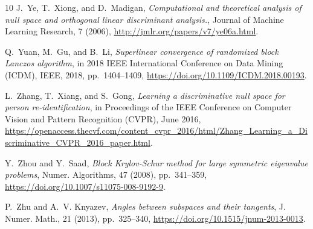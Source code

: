 \documentclass{siamart190516}
\begin{document}
\begin{thebibliography}{10}
{\sc J.~Ye, T.~Xiong, and D.~Madigan}, {\em Computational and theoretical
  analysis of null space and orthogonal linear discriminant analysis.}, Journal
  of Machine Learning Research, 7 (2006),
  \url{http://jmlr.org/papers/v7/ye06a.html}.

{\sc Q.~Yuan, M.~Gu, and B.~Li}, {\em Superlinear convergence of randomized
  block {Lanczos} algorithm}, in 2018 IEEE International Conference on Data
  Mining (ICDM), IEEE, 2018, pp.~1404--1409,
  \url{https://doi.org/10.1109/ICDM.2018.00193}.

{\sc L.~Zhang, T.~Xiang, and S.~Gong}, {\em Learning a discriminative null
  space for person re-identification}, in Proceedings of the IEEE Conference on
  Computer Vision and Pattern Recognition (CVPR), June 2016,
  \url{https://openaccess.thecvf.com/content_cvpr_2016/html/Zhang_Learning_a_Discriminative_CVPR_2016_paper.html}.

{\sc Y.~Zhou and Y.~Saad}, {\em Block {K}rylov-{S}chur method for large
  symmetric eigenvalue problems}, Numer. Algorithms, 47 (2008), pp.~341--359,
  \url{https://doi.org/10.1007/s11075-008-9192-9}.

{\sc P.~Zhu and A.~V. Knyazev}, {\em Angles between subspaces and their
  tangents}, J. Numer. Math., 21 (2013), pp.~325--340,
  \url{https://doi.org/10.1515/jnum-2013-0013}.

\end{thebibliography}
\end{document}
